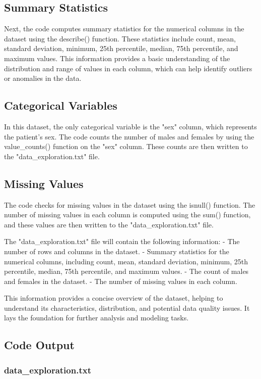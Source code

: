 \documentclass[11pt]{article}
\begin{document}
\subsection{Summary Statistics}
Next, the code computes summary statistics for the numerical columns in the dataset using the describe() function. These statistics include count, mean, standard deviation, minimum, 25th percentile, median, 75th percentile, and maximum values. This information provides a basic understanding of the distribution and range of values in each column, which can help identify outliers or anomalies in the data.

\subsection{Categorical Variables}
In this dataset, the only categorical variable is the "sex" column, which represents the patient's sex. The code counts the number of males and females by using the value\_counts() function on the "sex" column. These counts are then written to the "data\_exploration.txt" file.

\subsection{Missing Values}
The code checks for missing values in the dataset using the isnull() function. The number of missing values in each column is computed using the sum() function, and these values are then written to the "data\_exploration.txt" file.

The "data\_exploration.txt" file will contain the following information:
- The number of rows and columns in the dataset.
- Summary statistics for the numerical columns, including count, mean, standard deviation, minimum, 25th percentile, median, 75th percentile, and maximum values.
- The count of males and females in the dataset.
- The number of missing values in each column.

This information provides a concise overview of the dataset, helping to understand its characteristics, distribution, and potential data quality issues. It lays the foundation for further analysis and modeling tasks.

\subsection{Code Output}

\subsubsection*{data\_exploration.txt}
\end{document}
